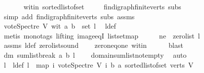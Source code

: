 \begin{isabellebody}
\ \ \ \ \isamarkupfalse%
\ \ wit{\isacharunderscore}{\kern0pt}in\ sorted{\isacharunderscore}{\kern0pt}list{\isacharunderscore}{\kern0pt}of{\isacharunderscore}{\kern0pt}set{\isacharparenleft}{\kern0pt}{}{\isacharparenright}{\kern0pt}\ \isanewline
\ \ \ \ fin{\isacharunderscore}{\kern0pt}digraph{\isachardot}{\kern0pt}finite{\isacharunderscore}{\kern0pt}verts\ subs\isanewline
\ \ \ \ \isamarkupfalse%
\ {\isacharparenleft}{\kern0pt}simp\ add{\isacharcolon}{\kern0pt}\ fin{\isacharunderscore}{\kern0pt}digraph{\isachardot}{\kern0pt}finite{\isacharunderscore}{\kern0pt}verts\ subs\ assms{\isacharparenleft}{\kern0pt}{}{\isacharparenright}{\kern0pt}{\isacharparenright}{\kern0pt}\ \isanewline
\ \ \isamarkupfalse%
\ \isamarkupfalse%
\ {\isachardoublequoteopen}vote{\isacharunderscore}{\kern0pt}Spectre\ V\ wit\ a\ b\ {\isasymin}\ set\ l{\isachardoublequoteclose}\ \isamarkupfalse%
\ l{\isacharunderscore}{\kern0pt}def\isanewline
\ \ \ \ \isamarkupfalse%
\ {\isacharparenleft}{\kern0pt}metis\ {\isacharparenleft}{\kern0pt}mono{\isacharunderscore}{\kern0pt}tags{\isacharcomma}{\kern0pt}\ lifting{\isacharparenright}{\kern0pt}\ image{\isacharunderscore}{\kern0pt}eqI\ list{\isachardot}{\kern0pt}set{\isacharunderscore}{\kern0pt}map{\isacharparenright}{\kern0pt}\isanewline
\ \ \isamarkupfalse%
\ \isamarkupfalse%
\ ne{}{\isacharcolon}{\kern0pt}\ {\isachardoublequoteopen}{\isasymnot}\ zero{\isacharunderscore}{\kern0pt}list\ l{\isachardoublequoteclose}\ \isamarkupfalse%
\ assms\ l{\isacharunderscore}{\kern0pt}def\ zero{\isacharunderscore}{\kern0pt}list{\isacharunderscore}{\kern0pt}sound\isanewline
\ \ \ \ zero{\isacharunderscore}{\kern0pt}neq{\isacharunderscore}{\kern0pt}one\ wit{\isacharunderscore}{\kern0pt}in\isanewline
\ \ \ \ \isamarkupfalse%
\ blast\ \isanewline
\ \ \isamarkupfalse%
\ \isamarkupfalse%
\ dm{\isacharcolon}{\kern0pt}\ {\isachardoublequoteopen}sumlist{\isacharunderscore}{\kern0pt}break\ a\ b\ l\ {\isasymin}\ {\isacharbraceleft}{\kern0pt}{\isacharminus}{\kern0pt}{}{\isacharcomma}{\kern0pt}{}{\isacharbraceright}{\kern0pt}{\isachardoublequoteclose}\ \isamarkupfalse%
\ domain{\isacharunderscore}{\kern0pt}sumlist{\isacharunderscore}{\kern0pt}not{\isacharunderscore}{\kern0pt}empty\ \isamarkupfalse%
\ auto\ \ \isanewline
\ \ \isamarkupfalse%
\ l{}\ \ l{}{\isacharunderscore}{\kern0pt}def{\isacharcolon}{\kern0pt}\ {\isachardoublequoteopen}l{}\ {\isacharequal}{\kern0pt}\ {\isacharparenleft}{\kern0pt}map\ {\isacharparenleft}{\kern0pt}{\isasymlambda}i{\isachardot}{\kern0pt}\ vote{\isacharunderscore}{\kern0pt}Spectre\ V\ i\ b\ a{\isacharparenright}{\kern0pt}\ {\isacharparenleft}{\kern0pt}sorted{\isacharunderscore}{\kern0pt}list{\isacharunderscore}{\kern0pt}of{\isacharunderscore}{\kern0pt}set\ {\isacharparenleft}{\kern0pt}verts\ V{\isacharparenright}{\kern0pt}{\isacharparenright}{\kern0pt}{\isacharparenright}{\kern0pt}{\isachardoublequoteclose}\isanewline

\end{isabellebody}
